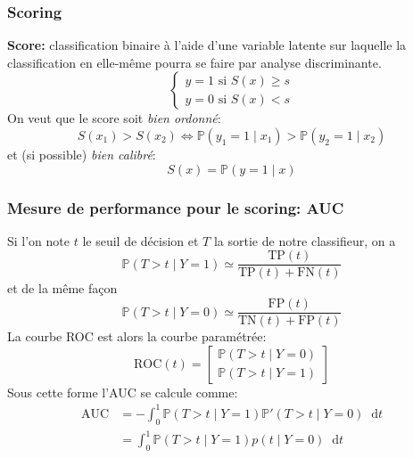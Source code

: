 \documentclass[dvipsnames,10pt]{beamer}
\newcommand*\diff{\mathop{}\!\mathrm{d}}
\theoremstyle{plain}
\theoremstyle{definition}
\begin{document}
\begin{frame}
\frametitle{Scoring}
\textbf{Score:} classification binaire à l'aide d'une variable latente sur laquelle la classification en elle-même pourra se faire par analyse discriminante.
    \begin{equation*}
        \begin{cases}
            y = 1 \text{ si } S(x) \geq s \\
            y = 0 \text{ si } S(x) < s
        \end{cases}
    \end{equation*}
On veut que le score soit \emph{bien ordonné}:
\begin{equation}
    S(x_1) > S(x_2) \Leftrightarrow \mathbb{P} \left( y_1 = 1 \mid x_1 \right) > \mathbb{P} \left( y_2 = 1 \mid x_2 \right)
    \label{equ:score.ordoné}
\end{equation}
et (si possible) \emph{bien calibré}:
\begin{equation*}
    S(x) = \mathbb{P} \left( y = 1 \mid x \right)
    \label{equ:score.calibré}
\end{equation*}
\end{frame}

\begin{frame}
\frametitle{Mesure de performance pour le scoring: AUC}
Si l'on note $t$ le seuil de décision et $T$ la sortie de notre classifieur, on a
\begin{equation*}
    \mathbb{P} ( T > t \mid Y = 1 ) \simeq \frac{\mathrm{TP} (t) }{\mathrm{TP} (t) +\mathrm{FN} (t) } 
\end{equation*}
et de la même façon
\begin{equation*}
    \mathbb{P} ( T > t \mid Y = 0 ) \simeq \frac{\mathrm{FP} (t)}{\mathrm{TN} (t) +\mathrm{FP} (t)}
\end{equation*}
La courbe ROC est alors la courbe paramétrée:
\begin{equation*}
    \mathrm{ROC} (t) = \begin{bmatrix}
        \mathbb{P} ( T > t \mid Y = 0 ) \\
        \mathbb{P} ( T > t \mid Y = 1 )
    \end{bmatrix}
\end{equation*}
Sous cette forme l'AUC se calcule comme:
\begin{align*}
    \mathrm{AUC} &=  - \int_0^1 \mathbb{P} ( T > t \mid Y = 1 ) \mathbb{P}' ( T > t \mid Y = 0 ) \diff t \\
    &= \int_0^1 \mathbb{P} ( T > t \mid Y = 1 ) p ( t \mid Y = 0 ) \diff t
\end{align*}
\end{frame}
\end{document}
